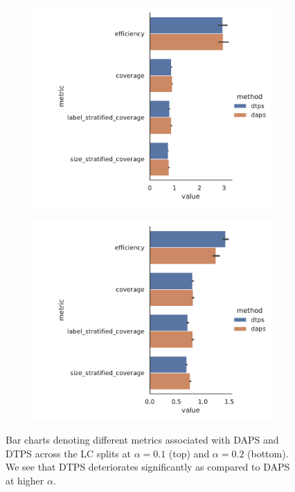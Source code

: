 \begin{figure}
    \centering
    \begin{subfigure}{0.7\linewidth}
        \includegraphics[width=\linewidth,alt={Bar charts denoting different metrics associated with DAPS and DTPS across the LC split at $\alpha=0.1$}]{graphConformal/figures/nspc/daps_dtps_0.1.png}
    \end{subfigure}
    \begin{subfigure}{0.7\linewidth}
        \includegraphics[width=\linewidth,alt={Bar charts denoting different metrics associated with DAPS and DTPS across the LC split at $\alpha=0.2$}]{graphConformal/figures/nspc/daps_dtps_0.2.png}
    \end{subfigure}
    \caption{Bar charts denoting different metrics associated with DAPS and DTPS across the LC splits at $\alpha=0.1$ (top) and $\alpha=0.2$ (bottom). We see that DTPS deteriorates significantly as compared to DAPS at higher $\alpha$.}
    \label{fig:nspc:conformal:daps_vs_dtps}
\end{figure}

